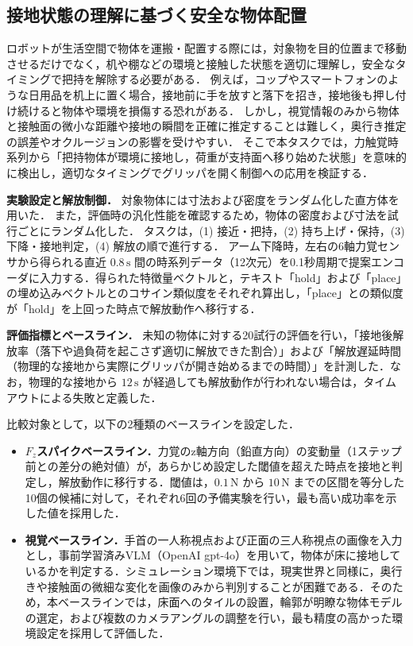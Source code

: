 \documentclass[Japanese]{dicomopapers}
\begin{document}
\subsection{接地状態の理解に基づく安全な物体配置}
ロボットが生活空間で物体を運搬・配置する際には，対象物を目的位置まで移動させるだけでなく，机や棚などの環境と接触した状態を適切に理解し，安全なタイミングで把持を解除する必要がある．
例えば，コップやスマートフォンのような日用品を机上に置く場合，接地前に手を放すと落下を招き，接地後も押し付け続けると物体や環境を損傷する恐れがある．
しかし，視覚情報のみから物体と接触面の微小な距離や接地の瞬間を正確に推定することは難しく，奥行き推定の誤差やオクルージョンの影響を受けやすい．
そこで本タスクでは，力触覚時系列から「把持物体が環境に接地し，荷重が支持面へ移り始めた状態」を意味的に検出し，適切なタイミングでグリッパを開く制御への応用を検証する．

\textbf{実験設定と解放制御．}
対象物体には寸法および密度をランダム化した直方体を用いた．
また，評価時の汎化性能を確認するため，物体の密度および寸法を試行ごとにランダム化した．
タスクは，(1) 接近・把持，(2) 持ち上げ・保持，(3) 下降・接地判定，(4) 解放の順で進行する．
アーム下降時，左右の6軸力覚センサから得られる直近 $0.8\,\text{s}$ 間の時系列データ（12次元）を0.1秒周期で提案エンコーダに入力する．得られた特徴量ベクトルと，テキスト「hold」および「place」の埋め込みベクトルとのコサイン類似度をそれぞれ算出し，「place」との類似度が「hold」を上回った時点で解放動作へ移行する．

\textbf{評価指標とベースライン．}
未知の物体に対する20試行の評価を行い，「接地後解放率（落下や過負荷を起こさず適切に解放できた割合）」および「解放遅延時間（物理的な接地から実際にグリッパが開き始めるまでの時間）」を計測した．なお，物理的な接地から $12\,\text{s}$ が経過しても解放動作が行われない場合は，タイムアウトによる失敗と定義した．

比較対象として，以下の2種類のベースラインを設定した．
\begin{itemize}
    \item[1.] \textbf{$F_z$スパイクベースライン．}力覚のz軸方向（鉛直方向）の変動量（1ステップ前との差分の絶対値）が，あらかじめ設定した閾値を超えた時点を接地と判定し，解放動作に移行する．閾値は，$0.1\,\text{N}$ から $10\,\text{N}$ までの区間を等分した10個の候補に対して，それぞれ6回の予備実験を行い，最も高い成功率を示した値を採用した．%
    \item[2.] \textbf{視覚ベースライン．}手首の一人称視点および正面の三人称視点の画像を入力とし，事前学習済みVLM（OpenAI gpt-4o）を用いて，物体が床に接地しているかを判定する．シミュレーション環境下では，現実世界と同様に，奥行きや接触面の微細な変化を画像のみから判別することが困難である．そのため，本ベースラインでは，床面へのタイルの設置，輪郭が明瞭な物体モデルの選定，および複数のカメラアングルの調整を行い，最も精度の高かった環境設定を採用して評価した．
\end{itemize}
\end{document}
